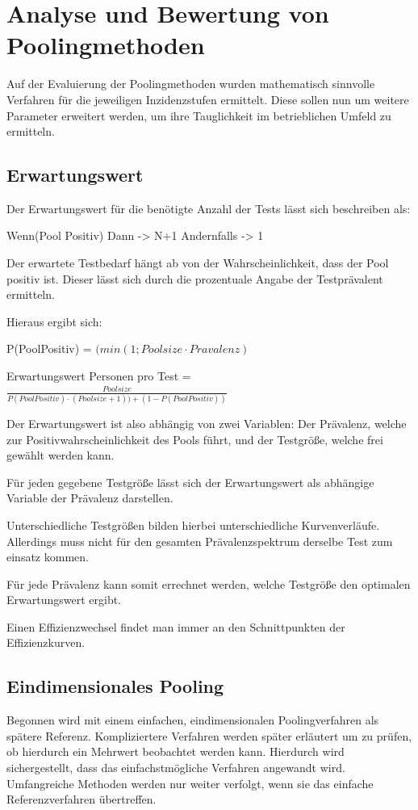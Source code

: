 \chapter{Analyse und Bewertung von Poolingmethoden}
Auf der Evaluierung der Poolingmethoden wurden mathematisch sinnvolle Verfahren für die jeweiligen Inzidenzstufen ermittelt.
Diese sollen nun um weitere Parameter erweitert werden, um ihre Tauglichkeit im betrieblichen Umfeld zu ermitteln.

\section{Erwartungswert}
Der Erwartungswert für die benötigte Anzahl der Tests lässt sich beschreiben als:

Wenn(Pool Positiv)
Dann -> N+1
Andernfalls -> 1

Der erwartete Testbedarf hängt ab von der Wahrscheinlichkeit, dass der Pool positiv ist.
Dieser lässt sich durch die prozentuale Angabe der Testprävalent ermitteln.

Hieraus ergibt sich:

P(PoolPositiv) = $(min\left(1;Poolsize\cdot Pravalenz\right)$

Erwartungswert Personen pro Test =
$\frac{Poolsize}{P(PoolPositiv)\cdot (Poolsize + 1)) + (1 - P(PoolPositiv))}$

Der Erwartungswert ist also abhängig von zwei Variablen: Der Prävalenz, welche zur Positivwahrscheinlichkeit des Pools führt, und der Testgröße, welche frei gewählt werden kann.

Für jeden gegebene Testgröße lässt sich der Erwartungswert als abhängige Variable der Prävalenz darstellen.

Unterschiedliche Testgrößen bilden hierbei unterschiedliche Kurvenverläufe.
Allerdings muss nicht für den gesamten Prävalenzspektrum derselbe Test zum einsatz kommen.

Für jede Prävalenz kann somit errechnet werden, welche Testgröße den optimalen Erwartungswert ergibt.

Einen Effizienzwechsel findet man immer an den Schnittpunkten der Effizienzkurven.

\section{Eindimensionales Pooling}
Begonnen wird mit einem einfachen, eindimensionalen Poolingverfahren als spätere Referenz.
Kompliziertere Verfahren werden später erläutert um zu prüfen, ob hierdurch ein Mehrwert beobachtet werden kann.
Hierdurch wird sichergestellt, dass das einfachstmögliche Verfahren angewandt wird.
Umfangreiche Methoden werden nur weiter verfolgt, wenn sie das einfache Referenzverfahren übertreffen.

